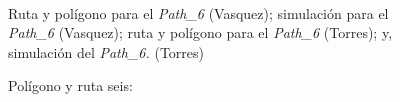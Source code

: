\documentclass[]{report}
\begin{document}
\begin{figure}%
	\centering
	\hspace{8pt}%
	 \\
	\hspace{8pt}%
	\caption[A set of four subfigures.]{Polígono y ruta seis:}
	 Ruta y polígono para el \textit{Path\_6} (Vasquez);
	 simulación para el \textit{Path\_6} (Vasquez);
	 ruta y polígono para el \textit{Path\_6} (Torres); y,
	 simulación del \textit{Path\_6.} (Torres)%
	\label{path_6}%
\end{figure}
\end{document}
